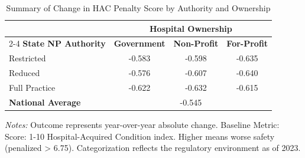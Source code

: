\begin{table}[htbp]
    \centering
    \caption{Summary of Change in HAC Penalty Score by Authority and Ownership}
    \label{tab:d_hac_total_score_own}
    \vspace{0.2cm}
    \begin{tabular}{lccc}
        \toprule
        & \multicolumn{3}{c}{\textbf{Hospital Ownership}} \\
        \cmidrule(lr){2-4}
        \textbf{State NP Authority} & \textbf{Government} & \textbf{Non-Profit} & \textbf{For-Profit} \\
        \midrule
        Restricted & -0.583 & -0.598 & -0.635 \\
        Reduced & -0.576 & -0.607 & -0.640 \\
        Full Practice & -0.622 & -0.632 & -0.615 \\
        \midrule
        \textbf{National Average} & \multicolumn{3}{c}{-0.545} \\
        \bottomrule
    \end{tabular}
    \vspace{0.1cm}
    \begin{minipage}{0.85\textwidth}
        \footnotesize \textit{Notes:} Outcome represents year-over-year absolute change. Baseline Metric: Score: 1-10 Hospital-Acquired Condition index. Higher means worse safety (penalized > 6.75). Categorization reflects the regulatory environment as of 2023.
    \end{minipage}
\end{table}